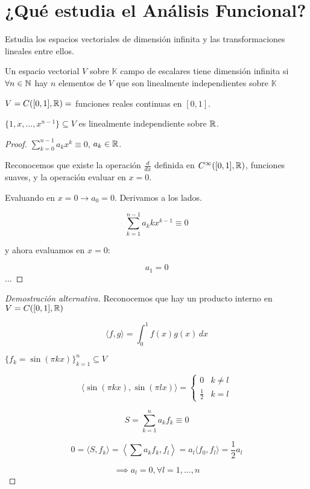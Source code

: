 \documentclass[../Apunte.tex]{subfiles}
\begin{document}
\section{¿Qué estudia el Análisis Funcional?}

Estudia los espacios vectoriales de dimensión infinita y las transformaciones lineales entre ellos.

\begin{fdefinition}
    Un espacio vectorial $V$ sobre $\mathbb{K}$ campo de escalares tiene dimensión infinita si $\forall n\in\mathbb{N}$ hay $n$ elementos de $V$ que son linealmente independientes sobre $\mathbb{K}$
\end{fdefinition}

\begin{fexample}
    $V=C([0,1],\mathbb{R})=$ funciones reales continuas en $[0,1]$.

    $\{1,x,\ldots,x^{n-1}\}\subseteq V$ es linealmente independiente sobre $\mathbb{R}$.
\end{fexample}

\begin{proof}
    $\displaystyle\sum_{k=0}^{n-1}a_kx^k\equiv 0$, $a_k\in\mathbb{R}$.

    Reconocemos que existe la operación $\frac{d}{dx}$ definida en $C^{\infty}([0,1],\mathbb{R})$, funciones suaves, y la operación evaluar en $x=0$.

    Evaluando en $x=0\to a_0=0$. Derivamos a los lados.

    \[\sum_{k=1}^{n-1}a_k k x^{k-1}\equiv 0\]

    y ahora evaluamos en $x=0$:
    
    $$a_1=0$$...
\end{proof}

\begin{proof}[Demostración alternativa]
    Reconocemos que hay un producto interno en $V=C([0,1],\mathbb{R})$

    \[\langle f,g\rangle=\int_0^1 f(x)g(x)\,dx\]

    $\{f_k=\sin (\pi kx)\}_{k=1}^n\subseteq V$

    \[\langle \sin (\pi kx),\sin (\pi lx)\rangle=\begin{cases} 0&k\neq l\\
    \frac{1}{2}&k=l\end{cases}\]

    \[S=\sum_{k=1}^n a_kf_k\equiv 0\]

    \[0=\langle S,f_k\rangle=\left\langle \sum a_kf_k,f_l\right\rangle=a_l\langle f_0,f_l\rangle =\frac{1}{2}a_l\]

    \[\implies a_l=0, \forall l=1,\ldots,n\]

\end{proof}
\end{document}
